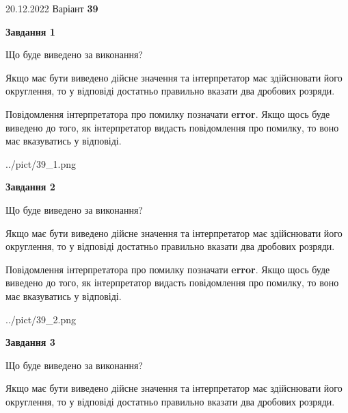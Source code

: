 \documentclass[12pt, ukrainian]{article}
\begin{document}
{20.12.2022 Варіант \No \textbf { 39 }\par}
{
\begin {Large}

{\begin {center}\textbf{Завдання 1}\end {center}}\par
Що буде виведено за виконання? \par

Якщо має бути виведено дійсне значення та інтерпретатор має здійснювати його округлення, 
то у відповіді достатньо правильно вказати два дробових розряди.

Повідомлення інтерпретатора про помилку позначати \textbf{error}.
Якщо щось буде виведено до того, як інтерпретатор видасть повідомлення про помилку, 
то воно має вказуватись у відповіді. \par

\begin{center}
	{../pict/39_1.png}
\end{center}
\newpage

{\begin {center}\textbf{Завдання 2}\end {center}}\par
Що буде виведено за виконання? \par

Якщо має бути виведено дійсне значення та інтерпретатор має здійснювати його округлення, 
то у відповіді достатньо правильно вказати два дробових розряди.

Повідомлення інтерпретатора про помилку позначати \textbf{error}.
Якщо щось буде виведено до того, як інтерпретатор видасть повідомлення про помилку, 
то воно має вказуватись у відповіді. \par

\begin{center}
	{../pict/39_2.png}
\end{center}
\newpage

{\begin {center}\textbf{Завдання 3}\end {center}}\par
Що буде виведено за виконання? \par

Якщо має бути виведено дійсне значення та інтерпретатор має здійснювати його округлення, 
то у відповіді достатньо правильно вказати два дробових розряди.


\end{Large}}
\end{document}
